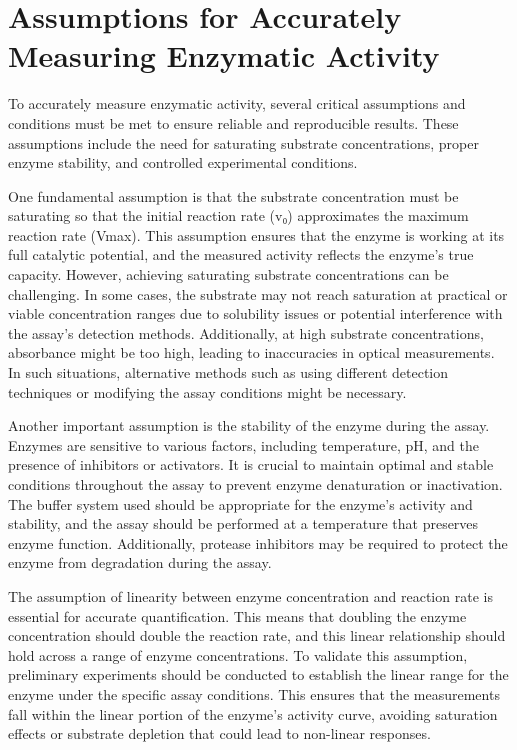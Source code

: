 \documentclass[
  9pt,
  american,
  a5paper,
  extrafontsizes,onecolumn,openright
  ]{memoir}
\newlength{\rf}
\begin{document}
\section{Assumptions for Accurately Measuring Enzymatic Activity}\label{assumptions-for-accurately-measuring-enzymatic-activity}

To accurately measure enzymatic activity, several critical assumptions and conditions must be met to ensure reliable and reproducible results. These assumptions include the need for saturating substrate concentrations, proper enzyme stability, and controlled experimental conditions.

One fundamental assumption is that the substrate concentration must be saturating so that the initial reaction rate (v₀) approximates the maximum reaction rate (Vmax). This assumption ensures that the enzyme is working at its full catalytic potential, and the measured activity reflects the enzyme's true capacity. However, achieving saturating substrate concentrations can be challenging. In some cases, the substrate may not reach saturation at practical or viable concentration ranges due to solubility issues or potential interference with the assay's detection methods. Additionally, at high substrate concentrations, absorbance might be too high, leading to inaccuracies in optical measurements. In such situations, alternative methods such as using different detection techniques or modifying the assay conditions might be necessary.

Another important assumption is the stability of the enzyme during the assay. Enzymes are sensitive to various factors, including temperature, pH, and the presence of inhibitors or activators. It is crucial to maintain optimal and stable conditions throughout the assay to prevent enzyme denaturation or inactivation. The buffer system used should be appropriate for the enzyme's activity and stability, and the assay should be performed at a temperature that preserves enzyme function. Additionally, protease inhibitors may be required to protect the enzyme from degradation during the assay.

The assumption of linearity between enzyme concentration and reaction rate is essential for accurate quantification. This means that doubling the enzyme concentration should double the reaction rate, and this linear relationship should hold across a range of enzyme concentrations. To validate this assumption, preliminary experiments should be conducted to establish the linear range for the enzyme under the specific assay conditions. This ensures that the measurements fall within the linear portion of the enzyme's activity curve, avoiding saturation effects or substrate depletion that could lead to non-linear responses.
\end{document}
